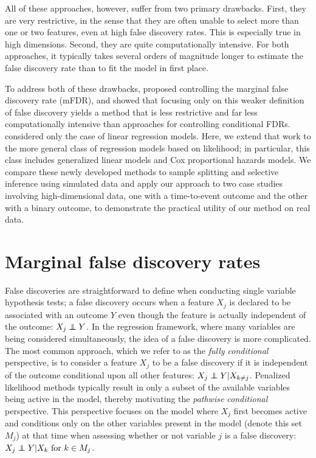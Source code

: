 All of these approaches, however, suffer from two primary drawbacks.  First, they are very restrictive, in the sense that they are often unable to select more than one or two features, even at high false discovery rates.  This is especially true in high dimensions.  Second, they are quite computationally intensive.  For both approaches, it typically takes several orders of magnitude longer to estimate the false discovery rate than to fit the model in first place.

To address both of these drawbacks, \citet{BrehenyMFDR} proposed controlling the marginal false discovery rate (mFDR), and showed that focusing only on this weaker definition of false discovery yields a method that is less restrictive and far less computationally intensive than approaches for controlling conditional FDRs.  \citet{BrehenyMFDR} considered only the case of linear regression models.  Here, we extend that work to the more general class of regression models based on likelihood; in particular, this class includes generalized linear models and Cox proportional hazards models.  We compare these newly developed methods to sample splitting and selective inference using simulated data and apply our approach to two case studies involving high-dimensional data, one with a time-to-event outcome and the other with a binary outcome, to demonstrate the practical utility of our method on real data.

\section{Marginal false discovery rates}
\label{Sec:mfdr}

False discoveries are straightforward to define when conducting single variable hypothesis tests; a false discovery occurs when a feature $X_j$ is declared to be associated with an outcome $Y$ even though the feature is actually independent of the outcome: $X_j \independent Y$. In the regression framework, where many variables are being considered simultaneously, the idea of a false discovery is more complicated. The most common approach, which we refer to as the \textit{fully conditional} perspective, is to consider a feature $X_j$ to be a false discovery if it is independent of the outcome conditional upon all other features: $X_j \independent Y | X_{k \neq j}$. Penalized likelihood methods typically result in only a subset of the available variables being active in the model, thereby motivating the \textit{pathwise conditional} perspective.  This perspective focuses on the model where $X_j$ first becomes active and conditions only on the other variables present in the model (denote this set $M_j$) at that time when assessing whether or not variable $j$ is a false discovery: $X_j \independent Y | X_k \text{ for } k \in M_j$.


